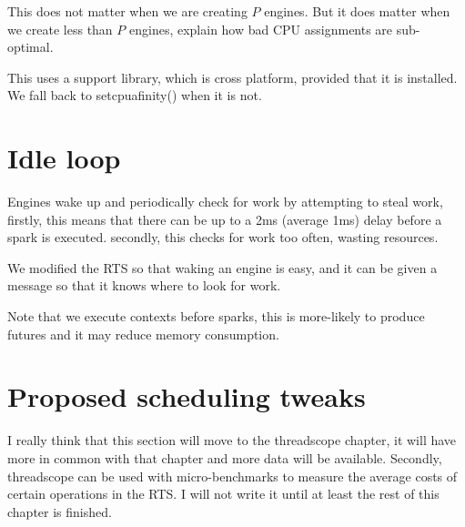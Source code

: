This does not matter when we are creating $P$ engines.
But it does matter when we create less than $P$ engines,
explain how bad CPU assignments are sub-optimal.

This uses a support library, which is cross platform, provided that it is installed.
We fall back to setcpuafinity() when it is not.


\section{Idle loop}
\label{sec:idle_loop}

Engines wake up and periodically check for work by attempting to
steal work,
firstly, this means that there can be up to a 2ms (average 1ms) delay before
a spark is executed.
secondly, this checks for work too often, wasting resources.

We modified the RTS so that waking an engine is easy, and it can be given a
message so that it knows where to look for work.




Note that we execute contexts before sparks,
this is more-likely to produce futures and it may reduce memory consumption.

\section{Proposed scheduling tweaks}
\label{sec:proposed_tweaks}

I really think that this section will move to the threadscope chapter,
it will have more in common with that chapter and more data will be
available.
Secondly, threadscope can be used with micro-benchmarks to measure the
average costs of certain operations in the RTS.
I will not write it until at least the rest of this chapter is finished.

